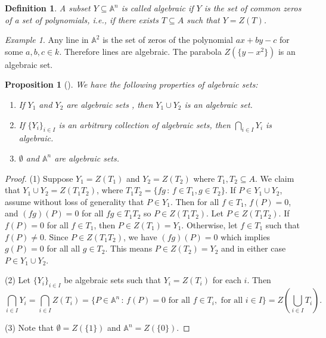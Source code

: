 \documentclass[12pt]{amsart}
\newcommand{\An}{\mathbb{A}^n}
\newtheorem{definition}[theorem]{Definition}
\newtheorem{proposition}[theorem]{Proposition}
\theoremstyle{remark}
\theoremstyle{remark}
\newtheorem*{example}{Example}
\begin{document}
\begin{definition}
A subset $Y \subseteq \An$ is called algebraic if $Y$ is the set of common zeros of a set of polynomials, i.e., if there exists $T \subseteq A$ such that $Y = Z(T)$.
\end{definition}

\begin{example}
Any line in $\mathbb{A}^2$ is the set of zeros of the polynomial $ax + by - c$ for some $a, b, c \in k$.
Therefore lines are algebraic.
The parabola $Z(\{y - x^2\})$ is an algebraic set.
\end{example}

\begin{proposition}[{\cite[Prop 1.1]{Hartshorne77}}]
We have the following properties of algebraic sets:
\begin{enumerate}
\item
If $Y_1$ and $Y_2$ are algebraic sets , then $Y_1 \cup Y_2$ is an algebraic set.

\item
If $\{Y_i\}_{i \in I}$ is an arbitrary collection of algebraic sets, then $\bigcap_{i \in I} Y_i$ is algebraic.

\item
$\emptyset$ and $\An$ are algebraic sets.
\end{enumerate}
\end{proposition}
\begin{proof}
(1) Suppose $Y_1 = Z(T_1)$ and $Y_2 = Z(T_2)$ where $T_1, T_2 \subseteq A$.
We claim that $Y_1 \cup Y_2 = Z(T_1 T_2)$, where $T_1 T_2 = \{f g \, : \, f \in T_1, g \in T_2\}$.
If $P \in Y_1 \cup Y_2$, assume without loss of generality that $P \in Y_1$.
Then for all $f \in T_1$, $f(P) = 0$, and $(fg)(P) = 0$ for all $fg \in T_1 T_2$ so $P \in Z(T_1 T_2)$.
Let $P \in Z(T_1 T_2)$.
If $f(P) = 0$ for all $f \in T_1$, then $P \in Z(T_1) = Y_1$.
Otherwise, let $f \in T_1$ such that $f(P) \ne 0$.
Since $P \in Z(T_1 T_2)$, we have $(fg)(P) = 0$ which implies $g(P) = 0$ for all all $g \in T_2$.
This means $P \in Z(T_2) = Y_2$ and in either case $P \in Y_1 \cup Y_2$.

(2) Let $\{Y_i\}_{i \in I}$ be algebraic sets such that $Y_i = Z(T_i)$ for each $i$.
Then
$$\bigcap_{i \in I} Y_i = \bigcap_{i \in I} Z(T_i) = \{P \in \An \, : \, f(P) = 0 \text{ for all } f  \in T_i, \text{ for all } i \in I\} = Z\left( \bigcup_{i \in I} T_i\right).$$

(3) Note that $\emptyset = Z(\{1\})$ and $\An = Z(\{0\})$.
\end{proof}
\end{document}
